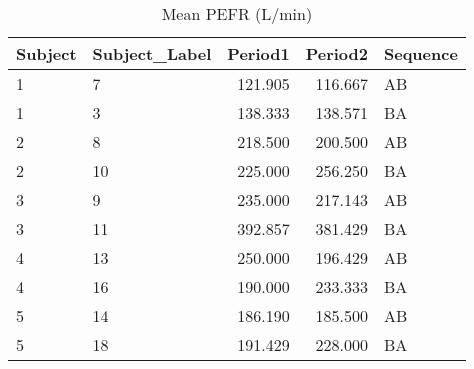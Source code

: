 \begin{table}
\centering
\caption{Mean PEFR (L/min)}
\centering
\begin{tabular}[t]{l|l|r|r|l}
\hline
Subject & Subject\_Label & Period1 & Period2 & Sequence\\
\hline
1 & 7 & 121.905 & 116.667 & AB\\
\hline
1 & 3 & 138.333 & 138.571 & BA\\
\hline
2 & 8 & 218.500 & 200.500 & AB\\
\hline
2 & 10 & 225.000 & 256.250 & BA\\
\hline
3 & 9 & 235.000 & 217.143 & AB\\
\hline
3 & 11 & 392.857 & 381.429 & BA\\
\hline
4 & 13 & 250.000 & 196.429 & AB\\
\hline
4 & 16 & 190.000 & 233.333 & BA\\
\hline
5 & 14 & 186.190 & 185.500 & AB\\
\hline
5 & 18 & 191.429 & 228.000 & BA\\
\hline
\end{tabular}
\end{table}
